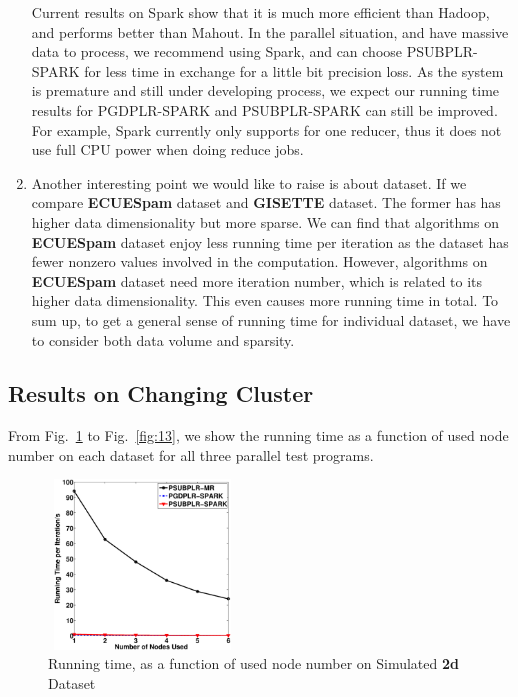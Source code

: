 \documentclass[10pt, conference, compsocconf]{IEEEtran}
\begin{document}
\begin{enumerate}
          Current results on Spark show that it is much more efficient than Hadoop, and performs better than Mahout.
          In the parallel situation, and have massive data to process, we recommend using Spark, and can choose PSUBPLR-SPARK for less time in exchange for a little bit precision loss.
          As the system is premature and still under developing process, we expect our running time results for PGDPLR-SPARK and PSUBPLR-SPARK can still be improved.
          For example, Spark currently only supports for one reducer, thus it does not use full CPU power when doing reduce jobs.
    \item Another interesting point we would like to raise is about dataset. If we compare \textbf{ECUESpam} dataset and \textbf{GISETTE} dataset.
          The former has has higher data dimensionality but more sparse.
          We can find that algorithms on \textbf{ECUESpam} dataset enjoy less running time per iteration as the dataset has fewer nonzero values involved in the computation.
          However, algorithms on \textbf{ECUESpam} dataset need more iteration number, which is related to its higher data dimensionality. This even causes more running time in total.
          To sum up, to get a general sense of running time for individual dataset, we have to consider both data volume and sparsity.
\end{enumerate}

\subsection{Results on Changing Cluster}
From Fig.~\ref{fig:09} to Fig.~\ref{fig:13}, we show the running time as a function of used node number on each dataset for all three parallel test programs.
\begin{figure}[tb] \label{fig:09}
\center \includegraphics[height=4.5cm,width=5cm]{img/2d_time.eps}
\caption{Running time, as a function of used node number on Simulated \textbf{2d} Dataset}
\end{figure}
\end{document}
